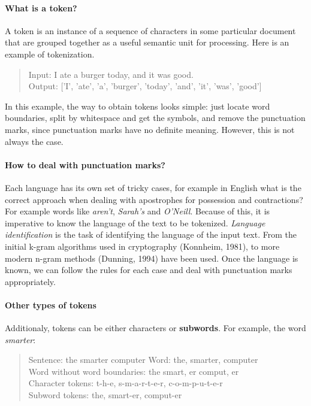 \paragraph{What is a token?}

A token is an instance of a sequence of characters in some particular document that are grouped together as a useful semantic unit for processing. Here is an example of tokenization.

\begin{quote}
    Input: I ate a burger today, and it was good.\\
    Output: ['I', 'ate', 'a', 'burger', 'today', 'and', 'it', 'was', 'good']
\end{quote}

In this example, the way to obtain tokens looks simple: just locate word boundaries, split by whitespace and get the symbols, and remove the punctuation marks, since punctuation marks have no definite meaning. However, this is not always the case.

\paragraph{How to deal with punctuation marks?}

Each language has its own set of tricky cases, for example in English what is the correct approach when dealing with apostrophes for possession and contractions? For example words like \emph{aren't}, \emph{Sarah's} and \emph{O'Neill}. Because of this, it is imperative to know the language of the text to be tokenized. \textit{Language identification} is the task of identifying the language of the input text. From the initial k-gram algorithms used in cryptography (Konnheim, 1981), to more modern n-gram methods (Dunning, 1994) have been used. Once the language is known, we can follow the rules for each case and deal with punctuation marks appropriately.

\paragraph{Other types of tokens}

Additionaly, tokens can be either characters or \textbf{subwords}. For example, the word \emph{smarter}:

\begin{quote}
    Sentence: the smarter computer
    Word: the, smarter, computer\\
    Word without word boundaries: the smart, er comput, er\\
    Character tokens: t-h-e, s-m-a-r-t-e-r, c-o-m-p-u-t-e-r\\
    Subword tokens: the, smart-er, comput-er
\end{quote}

